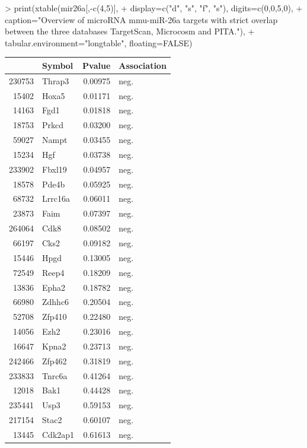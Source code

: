 \documentclass{article}
\begin{document}
\begin{Schunk}
\begin{Sinput}
> print(xtable(mir26a[,-c(4,5)],
+        display=c("d", "s", "f", "s"), digits=c(0,0,5,0),
+        caption="Overview of microRNA mmu-miR-26a targets with strict overlap between the three databases TargetScan, Microcosm and PITA."),
+        tabular.environment="longtable", floating=FALSE)
\end{Sinput}
\begin{longtable}{rlrl}
  \hline
 & Symbol & Pvalue & Association \\ 
  \hline
230753 & Thrap3 & 0.00975 & neg. \\ 
  15402 & Hoxa5 & 0.01171 & neg. \\ 
  14163 & Fgd1 & 0.01818 & neg. \\ 
  18753 & Prkcd & 0.03200 & neg. \\ 
  59027 & Nampt & 0.03455 & neg. \\ 
  15234 & Hgf & 0.03738 & neg. \\ 
  233902 & Fbxl19 & 0.04957 & neg. \\ 
  18578 & Pde4b & 0.05925 & neg. \\ 
  68732 & Lrrc16a & 0.06011 & neg. \\ 
  23873 & Faim & 0.07397 & neg. \\ 
  264064 & Cdk8 & 0.08502 & neg. \\ 
  66197 & Cks2 & 0.09182 & neg. \\ 
  15446 & Hpgd & 0.13005 & neg. \\ 
  72549 & Reep4 & 0.18209 & neg. \\ 
  13836 & Epha2 & 0.18782 & neg. \\ 
  66980 & Zdhhc6 & 0.20504 & neg. \\ 
  52708 & Zfp410 & 0.22480 & neg. \\ 
  14056 & Ezh2 & 0.23016 & neg. \\ 
  16647 & Kpna2 & 0.23713 & neg. \\ 
  242466 & Zfp462 & 0.31819 & neg. \\ 
  233833 & Tnrc6a & 0.41264 & neg. \\ 
  12018 & Bak1 & 0.44428 & neg. \\ 
  235441 & Usp3 & 0.59153 & neg. \\ 
  217154 & Stac2 & 0.60107 & neg. \\ 
  13445 & Cdk2ap1 & 0.61613 & neg. \\ 

\end{longtable}
\end{Schunk}
\end{document}
